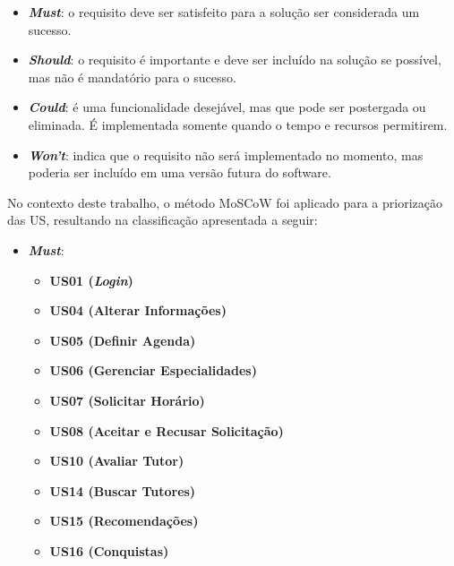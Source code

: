 \begin{itemize}

\item \textbf{\textit{Must}}: o requisito deve ser satisfeito para a solução ser considerada um sucesso.

\item \textbf{\textit{Should}}: o requisito é importante e deve ser incluído na solução se possível, mas não é mandatório para o sucesso.

\item\textbf{\textit{Could}}: é uma funcionalidade desejável, mas que pode ser postergada ou eliminada. É implementada somente quando o tempo e recursos permitirem.

\item \textbf{\textit{Won't}}: indica que o requisito não será implementado no momento, mas poderia ser incluído em uma versão futura do software.

\end{itemize}

No contexto deste trabalho, o método MoSCoW foi aplicado para a priorização das US, resultando na classificação apresentada a seguir:




\begin{itemize}

\item \textbf{\textit{Must}}:

\begin{itemize}

\item \textbf{US01 (\textit{Login})} 

\item \textbf{US04 (Alterar Informações)}

\item \textbf{US05 (Definir Agenda)}

\item \textbf{US06 (Gerenciar Especialidades)}

\item \textbf{US07 (Solicitar Horário)}

\item \textbf{US08 (Aceitar e Recusar Solicitação)}

\item \textbf{US10 (Avaliar Tutor)}

\item \textbf{US14 (Buscar Tutores)}

\item \textbf{US15 (Recomendações)}

\item \textbf{US16 (Conquistas)}

\end{itemize}

\end{itemize}

